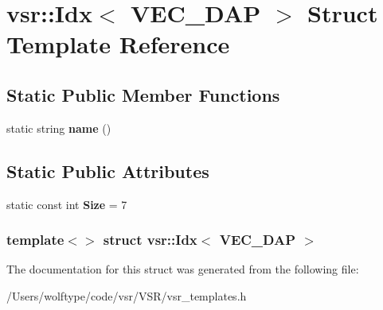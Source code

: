 \hypertarget{structvsr_1_1_idx_3_01_v_e_c___d_a_p_01_4}{\section{vsr\-:\-:Idx$<$ V\-E\-C\-\_\-\-D\-A\-P $>$ Struct Template Reference}
\label{structvsr_1_1_idx_3_01_v_e_c___d_a_p_01_4}
}
\subsection*{Static Public Member Functions}
\begin{DoxyCompactItemize}
\item 
\hypertarget{structvsr_1_1_idx_3_01_v_e_c___d_a_p_01_4_a68fc4960482b4c0e1f0be0cfe320f799}{static string {\bfseries name} ()}\label{structvsr_1_1_idx_3_01_v_e_c___d_a_p_01_4_a68fc4960482b4c0e1f0be0cfe320f799}

\end{DoxyCompactItemize}
\subsection*{Static Public Attributes}
\begin{DoxyCompactItemize}
\item 
\hypertarget{structvsr_1_1_idx_3_01_v_e_c___d_a_p_01_4_a49cc5bd08d309c401fc1f5324efc1509}{static const int {\bfseries Size} = 7}\label{structvsr_1_1_idx_3_01_v_e_c___d_a_p_01_4_a49cc5bd08d309c401fc1f5324efc1509}

\end{DoxyCompactItemize}
\subsubsection*{template$<$$>$ struct vsr\-::\-Idx$<$ V\-E\-C\-\_\-\-D\-A\-P $>$}



The documentation for this struct was generated from the following file\-:\begin{DoxyCompactItemize}
\item 
/\-Users/wolftype/code/vsr/\-V\-S\-R/vsr\-\_\-templates.\-h\end{DoxyCompactItemize}
